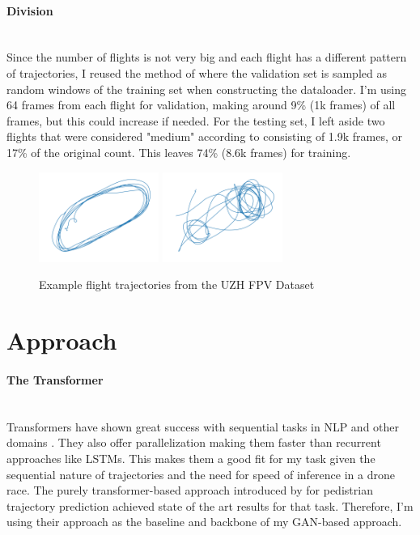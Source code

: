 \documentclass{article}
\begin{document}
\paragraph{Division}$ $
\\Since the number of flights is not very big and each flight has a different pattern of trajectories, I reused the method of \cite{giuliari2020transformer} where the validation set is sampled as random windows of the training set when constructing the dataloader. 
I'm using 64 frames from each flight for validation, making around 9\% (1k frames) of all frames, but this could increase if needed. For the testing set, I left aside two flights that were considered "medium" according to \citep{Delmerico19icra} consisting of 1.9k frames, or 17\% of the original count. This leaves 74\% (8.6k frames) for training.
\begin{figure}
    \centering
    \includegraphics[width=0.35\textwidth]{indoor_forward_3.png}
    \includegraphics[width=0.35\textwidth]{indoor_forward_7.png}  \\
    \caption{Example flight trajectories from the UZH FPV Dataset \cite{Delmerico19icra}}
    \label{DatasetExamples}
\end{figure}

\section{Approach}
\paragraph{The Transformer}$ $
\\Transformers have shown great success with sequential tasks in NLP and other domains \cite{attentionisallyouneed}. They also offer parallelization making them faster than recurrent approaches like LSTMs. This makes them a good fit for my task given the sequential nature of trajectories and the need for speed of inference in a drone race. The purely transformer-based approach introduced by \cite{giuliari2020transformer} for pedistrian trajectory prediction achieved state of the art results for that task. Therefore, I'm using their approach as the baseline and backbone of my GAN-based approach.
\end{document}
